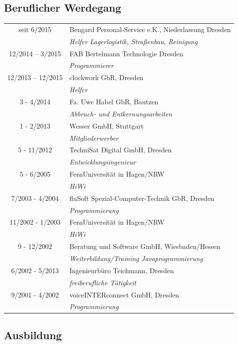 \documentclass{article}
\begin{document}
\subsection*{Beruflicher Werdegang}
\begin{tabular}{cp{15cm}}
seit 6/2015 			& 	Bengard Personal-Service e.K., Niederlassung Dresden\\
	    				& 	\it{Helfer Lagerlogistik, Stra\ss{}enbau, Reinigung}\\
12/2014  --  3/2015 	& FAB Bertelmann Technologie Dresden\\
		  				& \it{Programmierer}\\
12/2013  --  12/2015 	& clockwork GbR, Dresden\\
		   				& \it{Helfer}\\
3 - 4/2014		& Fa. Uwe Habel GbR, Bautzen\\
				& \it{Abbruch- und Entkernungsarbeiten}\\
1 - 2/2013		& Wesser GmbH, Stuttgart\\
				& \it{Mitgliederwerber}\\
5 - 11/2012		& TechniSat Digital GmbH, Dresden\\
				& \it{Entwicklungsingenieur}\\
5 - 6/2005		& FernUniversit\"at in Hagen/NRW\\
				& \it{HiWi}\\
7/2003 - 4/2004	& fluSoft Spezial-Computer-Technik GbR, Dresden\\
				& \it{Programmierung}\\
11/2002 - 1/2003	& FernUniversit\"at in Hagen/NRW\\
				& \it{HiWi}\\
9 - 12/2002		& Beratung und Software GmbH, Wiesbaden/Hessen\\
				& \it{Weiterbildung/Training Javaprogrammierung}\\
6/2002 - 5/2013	& Ingenieurb\"uro Teichmann, Dresden\\
				& \it{freiberufliche T\"atigkeit}\\
9/2001 - 4/2002	& voiceINTERconnect GmbH, Dresden\\
				& \it{Programmierung}\\
\end{tabular}


\subsection*{Ausbildung}
\end{document}
